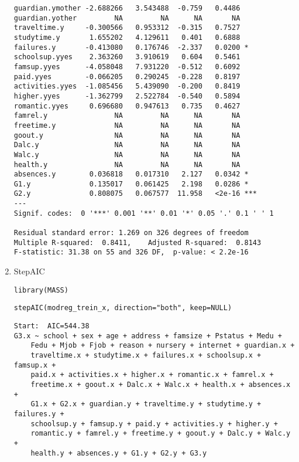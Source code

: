 \documentclass[11pt]{article}
\begin{document}
\begin{enumerate}
\begin{verbatim}
guardian.ymother -2.688266   3.543488  -0.759   0.4486    
guardian.yother         NA         NA      NA       NA    
traveltime.y     -0.300566   0.953312  -0.315   0.7527    
studytime.y       1.655202   4.129611   0.401   0.6888    
failures.y       -0.413080   0.176746  -2.337   0.0200 *  
schoolsup.yyes    2.363260   3.910619   0.604   0.5461    
famsup.yyes      -4.058048   7.931220  -0.512   0.6092    
paid.yyes        -0.066205   0.290245  -0.228   0.8197    
activities.yyes  -1.085456   5.439090  -0.200   0.8419    
higher.yyes      -1.362799   2.522784  -0.540   0.5894    
romantic.yyes     0.696680   0.947613   0.735   0.4627    
famrel.y                NA         NA      NA       NA    
freetime.y              NA         NA      NA       NA    
goout.y                 NA         NA      NA       NA    
Dalc.y                  NA         NA      NA       NA    
Walc.y                  NA         NA      NA       NA    
health.y                NA         NA      NA       NA    
absences.y        0.036818   0.017310   2.127   0.0342 *  
G1.y              0.135017   0.061425   2.198   0.0286 *  
G2.y              0.808075   0.067577  11.958   <2e-16 ***
---
Signif. codes:  0 '***' 0.001 '**' 0.01 '*' 0.05 '.' 0.1 ' ' 1

Residual standard error: 1.269 on 326 degrees of freedom
Multiple R-squared:  0.8411,	Adjusted R-squared:  0.8143 
F-statistic: 31.38 on 55 and 326 DF,  p-value: < 2.2e-16

\end{verbatim}

\item StepAIC
\label{sec:orgea903c4}
\begin{verbatim}
library(MASS)
\end{verbatim}

\begin{verbatim}
stepAIC(modreg_trein_x, direction="both", keep=NULL)
\end{verbatim}

\begin{verbatim}
Start:  AIC=544.38
G3.x ~ school + sex + age + address + famsize + Pstatus + Medu + 
    Fedu + Mjob + Fjob + reason + nursery + internet + guardian.x + 
    traveltime.x + studytime.x + failures.x + schoolsup.x + famsup.x + 
    paid.x + activities.x + higher.x + romantic.x + famrel.x + 
    freetime.x + goout.x + Dalc.x + Walc.x + health.x + absences.x + 
    G1.x + G2.x + guardian.y + traveltime.y + studytime.y + failures.y + 
    schoolsup.y + famsup.y + paid.y + activities.y + higher.y + 
    romantic.y + famrel.y + freetime.y + goout.y + Dalc.y + Walc.y + 
    health.y + absences.y + G1.y + G2.y + G3.y



\end{verbatim}
\end{enumerate}
\end{document}

